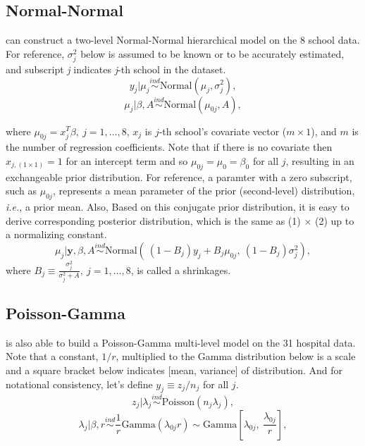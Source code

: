 \documentclass[article]{jss}
\begin{document}
 
\subsection[Normal-Normal]{Normal-Normal}
 can construct a two-level Normal-Normal hierarchical model on the 8 school data. For reference,  $\sigma^{2}_{j}$ below is assumed to be known or to be accurately estimated, and subscript \emph{j} indicates \emph{j}-th school in the dataset.
\begin{equation}
y_{j}\vert \mu_{j} \stackrel{ind}{\sim}\textrm{Normal}(\mu_{j}, \sigma^{2}_{j}),
\end{equation}
\begin{equation}
\mu_{j}\vert \beta, A\stackrel{ind}{\sim}\textrm{Normal}(\mu_{0j}, A),
\end{equation}

where $\mu_{0j} =x^{T}_{j}\beta,~j=1, \ldots, 8$, $x_{j}$ is $j$-th school's covariate vector ($m\times 1$), and $m$ is the number of regression coefficients. Note that if there is no covariate then $x_{j, (1\times1)}=1$ for an intercept term and so $\mu_{0j}=\mu_{0}=\beta_{0}$ for all $j$, resulting in an exchangeable prior distribution. For reference, a paramter with a zero subscript, such as $\mu_{0j}$, represents a mean parameter of the prior (second-level) distribution, \emph{i.e.}, a prior mean. Also,  Based on this conjugate prior distribution, it is easy to derive corresponding posterior distribution, which is the same as (1) $\times$ (2) up to a normalizing constant.
\begin{equation}
\mu_{j}\vert \textbf{y}, \beta, A \stackrel{ind}{\sim}\textrm{Normal}(~(1-B_{j})y_{j} + B_{j}\mu_{0j},~(1-B_{j})\sigma^{2}_{j}),
\end{equation}
where $B_{j}\equiv\frac{\sigma^{2}_{j}}{\sigma^{2}_{j} + A},~j=1, \ldots, 8$, is called a shrinkages.

\subsection[Poisson-Gamma]{Poisson-Gamma}
 is also able to build a Poisson-Gamma multi-level model on the 31 hospital data. Note that a constant, $1/r$, multiplied to the Gamma distribution below is a scale and a square bracket below indicates [mean, variance] of distribution. And for notational consistency, let's define $y_{j}\equiv z_{j} / n_{j}$ for all $j$.
\begin{equation}
z_{j}\vert \lambda_{j} \stackrel{ind}{\sim}\textrm{Poisson}(n_{j}\lambda_{j}),
\end{equation}
\begin{equation}
\lambda_{j}\vert \beta, r\stackrel{ind}{\sim}\frac{1}{r}\textrm{Gamma}(\lambda_{0j}r)\sim \textrm{Gamma}[\lambda_{0j}, ~\frac{\lambda_{0j}}{r}],
\end{equation}
\end{document}
